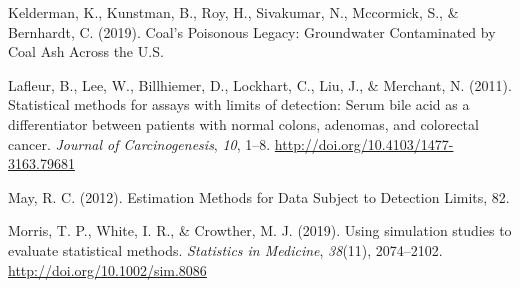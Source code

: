 \documentclass[12pt, twoside]{amherstthesis}
\newlength{\cslhangindent}
\newenvironment{cslreferences}%
  {\setlength{\parindent}{0pt}%
  \everypar{\setlength{\hangindent}{\cslhangindent}}\ignorespaces}%
  {\par}
\begin{document}
\begin{cslreferences}
\leavevmode\hypertarget{ref-Kelderman2019}{}%
Kelderman, K., Kunstman, B., Roy, H., Sivakumar, N., Mccormick, S., \& Bernhardt, C. (2019). Coal's Poisonous Legacy: Groundwater Contaminated by Coal Ash Across the U.S.

\leavevmode\hypertarget{ref-Lafleur2011}{}%
Lafleur, B., Lee, W., Billhiemer, D., Lockhart, C., Liu, J., \& Merchant, N. (2011). Statistical methods for assays with limits of detection: Serum bile acid as a differentiator between patients with normal colons, adenomas, and colorectal cancer. \emph{Journal of Carcinogenesis}, \emph{10}, 1--8. \url{http://doi.org/10.4103/1477-3163.79681}

\leavevmode\hypertarget{ref-May2012}{}%
May, R. C. (2012). Estimation Methods for Data Subject to Detection Limits, 82.

\leavevmode\hypertarget{ref-Morris2019}{}%
Morris, T. P., White, I. R., \& Crowther, M. J. (2019). Using simulation studies to evaluate statistical methods. \emph{Statistics in Medicine}, \emph{38}(11), 2074--2102. \url{http://doi.org/10.1002/sim.8086}
\end{cslreferences}
\end{document}
